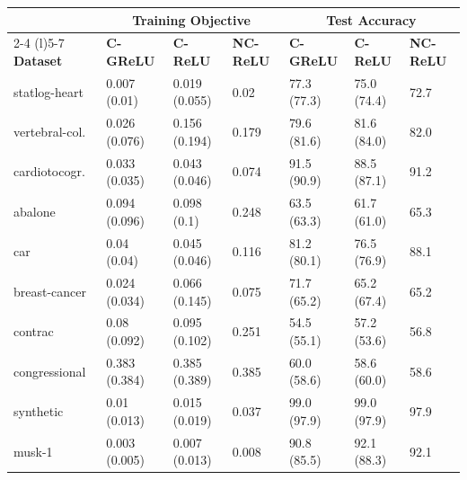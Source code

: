 \begin{table}[t]
	\centering
	\begin{tabular}{lllllll} \toprule
		                 & \multicolumn{3}{c}{Training Objective} & \multicolumn{3}{c}{Test Accuracy}                                                                            \\ \cmidrule(r){2-4} \cmidrule(l){5-7}
		\textbf{Dataset} & \textbf{C-GReLU}                       & \textbf{C-ReLU}                   & \textbf{NC-ReLU} & \textbf{C-GReLU} & \textbf{C-ReLU} & \textbf{NC-ReLU} \\ \midrule
		statlog-heart    & 0.007 (0.01)                           & 0.019 (0.055)                     & 0.02             & 77.3 (77.3)      & 75.0 (74.4)     & 72.7             \\
		vertebral-col.   & 0.026 (0.076)                          & 0.156 (0.194)                     & 0.179            & 79.6 (81.6)      & 81.6 (84.0)     & 82.0             \\
		cardiotocogr.    & 0.033 (0.035)                          & 0.043 (0.046)                     & 0.074            & 91.5 (90.9)      & 88.5 (87.1)     & 91.2             \\
		abalone          & 0.094 (0.096)                          & 0.098 (0.1)                       & 0.248            & 63.5 (63.3)      & 61.7 (61.0)     & 65.3             \\
		car              & 0.04  (0.04)                           & 0.045 (0.046)                     & 0.116            & 81.2 (80.1)      & 76.5 (76.9)     & 88.1             \\
		breast-cancer    & 0.024 (0.034)                          & 0.066 (0.145)                     & 0.075            & 71.7 (65.2)      & 65.2 (67.4)     & 65.2             \\
		contrac          & 0.08  (0.092)                          & 0.095 (0.102)                     & 0.251            & 54.5 (55.1)      & 57.2 (53.6)     & 56.8             \\
		congressional    & 0.383 (0.384)                          & 0.385 (0.389)                     & 0.385            & 60.0 (58.6)      & 58.6 (60.0)     & 58.6             \\
		synthetic        & 0.01  (0.013)                          & 0.015 (0.019)                     & 0.037            & 99.0 (97.9)      & 99.0 (97.9)     & 97.9             \\
		musk-1           & 0.003 (0.005)                          & 0.007 (0.013)                     & 0.008            & 90.8 (85.5)      & 92.1 (88.3)     & 92.1             \\

\end{tabular}
\end{table}
